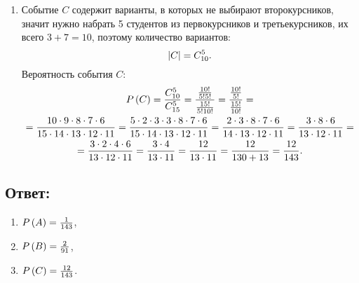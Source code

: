 \begin{enumerate}
    \item
    Событие $C$ содержит варианты, в которых не выбирают второкурсников, значит нужно набрать 5 студентов из первокурсников и третьекурсников, их всего $3 + 7 = 10$, поэтому
    количество вариантов:
    \begin{equation}
        \left | C \right | = C_{10}^5 .
    \end{equation}
    Вероятность события $C$:
    \begin{multline}
        P \left ( C \right )
        = \frac{C_{10}^5}{C_{15}^5}
        = \frac{\frac{10!}{5!5!}}{\frac{15!}{5!10!}}
        = \frac{\frac{10!}{5!}}{\frac{15!}{10!}} = \\
        = \frac{10 \cdot 9 \cdot 8 \cdot 7 \cdot 6}{15 \cdot 14 \cdot 13 \cdot 12 \cdot 11}
        = \frac{5 \cdot 2 \cdot 3 \cdot 3 \cdot 8 \cdot 7 \cdot 6}{15 \cdot 14 \cdot 13 \cdot 12 \cdot 11}
        = \frac{2 \cdot 3 \cdot 8 \cdot 7 \cdot 6}{14 \cdot 13 \cdot 12 \cdot 11}
        = \frac{3 \cdot 8 \cdot 6}{13 \cdot 12 \cdot 11} = \\
        = \frac{3 \cdot 2 \cdot 4 \cdot 6}{13 \cdot 12 \cdot 11}
        = \frac{3 \cdot 4}{13 \cdot 11}
        = \frac{12}{13 \cdot 11}
        = \frac{12}{130 + 13}
        = \frac{12}{143} .
    \end{multline}
\end{enumerate}

\subsection*{Ответ:}
\begin{enumerate}
    \item $P \left ( A \right ) = \frac{1}{143}$,
    \item $P \left ( B \right ) = \frac{2}{91}$,
    \item $P \left ( C \right ) = \frac{12}{143}$.
\end{enumerate}